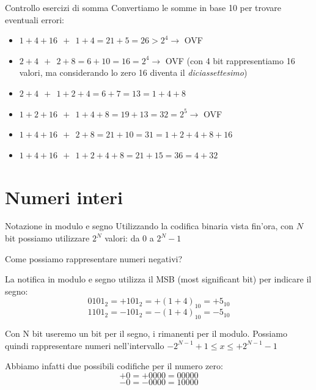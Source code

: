 \documentclass[9pt, handout]{beamer}
\begin{document}
\begin{frame}{Controllo esercizi di somma}
Convertiamo le somme in base 10 per trovare eventuali errori:

\begin{itemize}
\item $1+4+16 \ \ + \ \ 1+4 = 21+5 = 26 > 2^4 \rightarrow$ \alert{OVF}
\item $2+4 \ \ + \ \ 2+8 = 6+10 = 16 = 2^4 \rightarrow$ \alert{OVF} (con 4 bit rappresentiamo 16 valori, ma considerando lo zero 16 diventa il \emph{diciassettesimo})
\item $2+4 \ \ + \ \ 1+2+4 = 6+7 = 13 = 1+4+8$
\item $1+2+16 \ \ + \ \ 1+4+8 = 19+13 = 32 = 2^5 \rightarrow$ \alert{OVF}
\item $1+4+16 \ \ + \ \ 2+8 = 21+10 = 31 = 1+2+4+8+16$
\item $1+4+16 \ \ + \ \ 1+2+4+8 = 21+15 = 36 = 4+32$
\end{itemize}
\end{frame}

\section{Numeri interi}
\begin{frame}{Notazione in modulo e segno}
Utilizzando la codifica binaria vista fin'ora, con $N$ bit possiamo utilizzare $2^N$ valori: da 0 a $2^N - 1$

Come possiamo rappresentare numeri negativi?

\pause

La notifica in modulo e segno utilizza il \alert{MSB} (most significant bit) per indicare il segno:
\[0101_2 = +101_2 = +(1+4)_{10} = +5_{10}\]
\[1101_2 = -101_2 = -(1+4)_{10} = -5_{10}\]

\pause

Con N bit useremo un bit per il segno, i rimanenti per il modulo.
Possiamo quindi rappresentare numeri nell'intervallo $-2^{N-1}+1 \leq x \leq +2^{N-1}-1$

\pause

Abbiamo infatti due possibili codifiche per il numero zero:
\[+0 = +0000 = 00000\]
\[-0 = -0000 = 10000\]
\end{frame}
\end{document}
